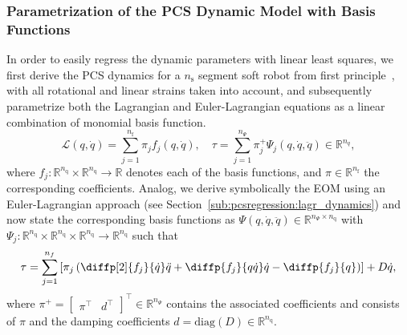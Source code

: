 \subsubsection{Parametrization of the PCS Dynamic Model with Basis Functions}
In order to easily regress the dynamic parameters with linear least squares, we first derive the \gls{PCS} dynamics for a $n_\mathrm{s}$ segment soft robot from first principle~\citep{armanini2023soft, della2023model}, with all rotational and linear strains taken into account, and subsequently parametrize both the Lagrangian and Euler-Lagrangian equations as a linear combination of monomial basis function.
\begin{equation}\label{eq:pcsregression:lagrangian_basis_functions}
    \mathcal{L}(q, \dot{q}) = \sum_{j=1}^{n_\mathrm{f}} \pi_j f_j(q, \dot{q}), 
    \quad
    \tau = \sum_{j=1}^{n_\Psi} \pi_j^{+}\Psi_j(q,\dot{q},\ddot{q}) \in \mathbb{R}^{n_q},
\end{equation}
where $f_j: \mathbb{R}^{n_\mathrm{q}} \times \mathbb{R}^{n_\mathrm{q}} \to \mathbb{R}$ denotes each of the basis functions, and $\pi \in \mathbb{R}^{n_\mathrm{f}}$ the corresponding coefficients.
Analog, we derive symbolically the \gls{EOM} using an Euler-Lagrangian approach (see Section~\ref{sub:pcsregression:lagr_dynamics}) and now state the corresponding basis functions as $\Psi(q, \dot{q}, \ddot{q}) \in \mathbb{R}^{n_\Psi \times n_\mathrm{q}}$ with $\Psi_j: \mathbb{R}^{n_\mathrm{q}} \times \mathbb{R}^{n_\mathrm{q}} \times \mathbb{R}^{n_\mathrm{q}} \to \mathbb{R}^{n_\mathrm{q}}$ such that
\begin{equation}
    \tau = \sum_{j=1}^{n_{f}} \left[ \pi_j \left( \diffp[2]{f_j}{{\dot{q}}}\ddot{q} + \diffp{f_j}{{q}{\dot{q}}}\dot{q} - \diffp{f_j}{{q}} \right) \right] + D\dot{q},
\end{equation}
where
$\pi^+ = \begin{bmatrix}
    \pi^\top & d^\top 
\end{bmatrix}^\top \in \mathbb{R}^{n_{\Psi}}$ contains the associated coefficients and consists of $\pi$ and the damping coefficients $d = \mathrm{diag}(D) \in \mathbb{R}^{n_\mathrm{q}}$.

